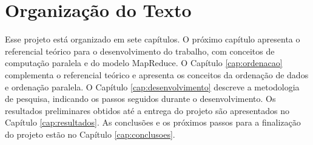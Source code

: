 \section{Organização do Texto}
\label{sec:organizacaoTexto}

Esse projeto está organizado em sete capítulos. O próximo capítulo apresenta o referencial teórico para o desenvolvimento do trabalho, com conceitos de computação paralela  e do modelo MapReduce. O Capítulo \ref{cap:ordenacao} complementa o referencial teórico e apresenta os conceitos da ordenação de dados e ordenação paralela. 
O Capítulo \ref{cap:desenvolvimento} descreve a metodologia de pesquisa, indicando os passos seguidos durante o desenvolvimento. Os resultados preliminares obtidos até a entrega do projeto são apresentados no Capítulo \ref{cap:resultados}. As conclusões e os próximos passos para a finalização do projeto estão no Capítulo \ref{cap:conclusoes}.

